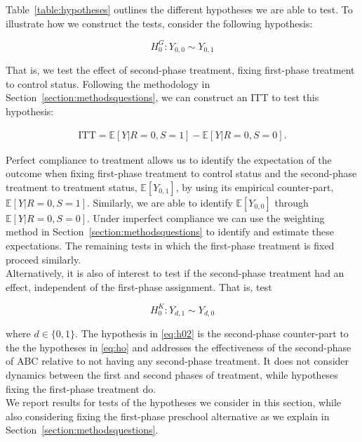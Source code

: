 \noindent Table~\ref{table:hypotheses} outlines the different hypotheses we are able to test. To illustrate how we construct the tests, consider the following hypothesis: 

\begin{equation}
H_{0}^G: Y_{0,0} \sim Y_{0,1}  \label{eq:h0fixfirst}
\end{equation}

\noindent That is, we test the effect of second-phase treatment, fixing first-phase treatment to control status. Following the methodology in Section~\ref{section:methodsquestions}, we can construct an ITT to test this hypothesis: 

\begin{eqnarray}
\text{ITT} = \mathbb{E} \left[ Y | R = 0, S = 1 \right] - \mathbb{E} \left[ Y | R = 0, S = 0 \right]. 
\end{eqnarray}

\noindent Perfect compliance to treatment allows us to identify the expectation of the outcome when fixing first-phase treatment to control status and the second-phase treatment to treatment status, $\mathbb{E} \left[ Y_{0,1} \right]$, by using its empirical counter-part, $\mathbb{E} \left[ Y | R = 0, S = 1 \right]$. Similarly, we are able to identify $\mathbb{E} \left[ Y_{0,0} \right]$ through $\mathbb{E} \left[ Y | R = 0, S = 0 \right]$. Under imperfect compliance we can use the weighting method in Section~\ref{section:methodsquestions} to identify and estimate these expectations. The remaining tests in which the first-phase treatment is fixed proceed similarly.\\

\noindent Alternatively, it is also of interest to test if the second-phase treatment had an effect, independent of the first-phase assignment. That is, test 

\begin{equation}
H_{0}^K: Y_{d,1} \sim Y_{d,0} \label{eq:h02}
\end{equation}

\noindent where $d \in \{0,1\}$. The hypothesis in \eqref{eq:h02} is the second-phase counter-part to the the hypotheses in \eqref{eq:ho} and addresses the effectiveness of the second-phase of ABC relative to not having any second-phase treatment. It does not consider dynamics between the first and second phases of treatment, while hypotheses fixing the first-phase treatment do.\\

\noindent We report results for tests of the hypotheses we consider in this section, while also considering fixing the first-phase preschool alternative as we explain in Section~\ref{section:methodsquestions}.

